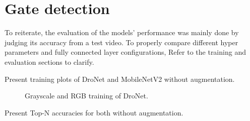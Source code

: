 \section{Gate detection}

To reiterate, the evaluation of the models' performance was mainly done by
judging its accuracy from a test video. To properly compare different
hyper parameters and fully connected layer configurations, 
Refer to the training and evaluation sections to clarify.

Present training plots of DroNet and MobileNetV2 without augmentation. 

\begin{figure}[h]
	\centering
	
	\caption{Grayscale and RGB training of DroNet.}
\end{figure}





Present Top-N accuracies for both without augmentation.
